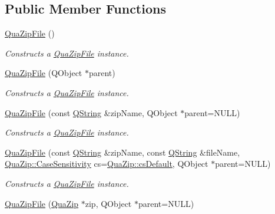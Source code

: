 \subsection*{Public Member Functions}
\begin{DoxyCompactItemize}
\item 
\hyperlink{class_qua_zip_file_ad31592e0e8a9eaa009c6c0e2040a2158}{Qua\-Zip\-File} ()
\begin{DoxyCompactList}\small\item\em Constructs a \hyperlink{class_qua_zip_file}{Qua\-Zip\-File} instance. \end{DoxyCompactList}\item 
\hyperlink{class_qua_zip_file_a1349ad27f1947bc3e346d83dbf9586c4}{Qua\-Zip\-File} (Q\-Object $\ast$parent)
\begin{DoxyCompactList}\small\item\em Constructs a \hyperlink{class_qua_zip_file}{Qua\-Zip\-File} instance. \end{DoxyCompactList}\item 
\hyperlink{class_qua_zip_file_ae614495d6b2404a6c59d7cfca5c3f6fd}{Qua\-Zip\-File} (const \hyperlink{group___u_a_v_objects_plugin_gab9d252f49c333c94a72f97ce3105a32d}{Q\-String} \&zip\-Name, Q\-Object $\ast$parent=N\-U\-L\-L)
\begin{DoxyCompactList}\small\item\em Constructs a \hyperlink{class_qua_zip_file}{Qua\-Zip\-File} instance. \end{DoxyCompactList}\item 
\hyperlink{class_qua_zip_file_ac6e883b5a5d3a58c9c56eb497dd91220}{Qua\-Zip\-File} (const \hyperlink{group___u_a_v_objects_plugin_gab9d252f49c333c94a72f97ce3105a32d}{Q\-String} \&zip\-Name, const \hyperlink{group___u_a_v_objects_plugin_gab9d252f49c333c94a72f97ce3105a32d}{Q\-String} \&file\-Name, \hyperlink{class_qua_zip_a6053a1d249ed210a85c9d5eb7cf9cdbe}{Qua\-Zip\-::\-Case\-Sensitivity} cs=\hyperlink{class_qua_zip_a6053a1d249ed210a85c9d5eb7cf9cdbeac3cca8c0b976cf6397a28a5c84e75253}{Qua\-Zip\-::cs\-Default}, Q\-Object $\ast$parent=N\-U\-L\-L)
\begin{DoxyCompactList}\small\item\em Constructs a \hyperlink{class_qua_zip_file}{Qua\-Zip\-File} instance. \end{DoxyCompactList}\item 
\hyperlink{class_qua_zip_file_a54e944a6b3d27030f64c8f30d2cc33bb}{Qua\-Zip\-File} (\hyperlink{class_qua_zip}{Qua\-Zip} $\ast$zip, Q\-Object $\ast$parent=N\-U\-L\-L)

\end{DoxyCompactItemize}
